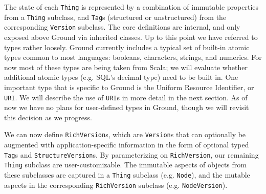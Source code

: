 \documentclass{article}
\newenvironment{tldr}[1][r]
  {\wrapfigure{#1}{0.33\textwidth}\tcolorbox}
  {\endtcolorbox\endwrapfigure}
\newcommand{\core}{core\xspace}
\newcommand{\mantle}{mantle\xspace}
\newcommand{\version}{\texttt{Version}\xspace}
\newcommand{\richversion}{\texttt{RichVersion}\xspace}
\newcommand{\thing}{\texttt{Thing}\xspace}
\newcommand{\node}{\texttt{Node}\xspace}
\newcommand{\tag}{\texttt{Tag}\xspace}
\newcommand{\uri}{\texttt{URI}\xspace}
\newcommand{\jmh}[1]{{\textcolor{red}{#1---jmh}}}
\begin{document}
\begin{tldr}
The state of each \thing is represented by a combination of immutable properties from a \thing subclass, and {\tag}s (structured or unstructured) from the corresponding \version subclass.
The \core definitions are internal, and only exposed above Ground via inherited classes.
\end{tldr}
Up to this point we have referred to types rather loosely.  Ground currently includes 
a typical set of built-in atomic types common to most languages: booleans, characters, strings, and
numerics.  For now most of these types are being taken from Scala; we will evaluate whether additional 
atomic types (e.g. SQL's decimal type) need to be built in.  One important type that is specific to 
Ground is the Uniform Resource Identifier, or \uri.  We will describe the use of {\uri}s in more detail in the next section.  As of now we have no plans for user-defined types in Ground, though we will revisit
this decision as we progress.

We can now define {\richversion}s, which are {\version}s that can optionally be augmented with application-specific information in the form 
of optional typed {\tag}s and \texttt{StructureVersion}s.  By parameterizing on \richversion, our remaining \thing subclass are user-customizable.  The immutable aspects of objects from these subclasses are captured in a \thing subclass
(e.g. \node), and the mutable aspects in the corresponding \richversion subclass (e.g.
\texttt{NodeVersion}).  

\end{document}
